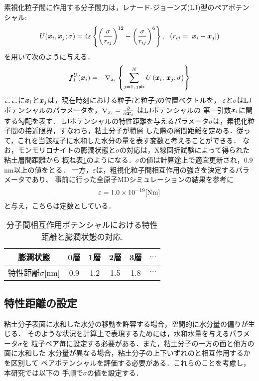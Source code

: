素視化粒子間に作用する分子間力は，レナード-ジョーンズ(LJ)型のペアポテンシャル:
\begin{equation}
	U(\mbox{\boldmath $x$}_i,\mbox{\boldmath $x$}_j; \sigma) 
	= 4 \varepsilon 
	\left\{ 
	\left(\frac{\sigma}{r_{ij}}\right)^{12}
	-
	\left(\frac{\sigma}{r_{ij}}\right)^6
	\right\}, \ \ \left( r_{ij}=\left| \mbox{\boldmath $x$}_i-\mbox{\boldmath $x$}_j\right| \right)
	\label{eqn:LJ}
\end{equation}
を用いて次のように与える．
\begin{equation}
	\mbox{\boldmath $f$}_i^U(\mbox{\boldmath $x$}_i)
	=
	-\nabla_{x_i} 
	\left\{ 
		\sum_{j=1, \, j \neq i}^N U\left(\mbox{\boldmath $x$}_i,\,\mbox{\boldmath $x$}_j; \sigma \right)
	\right\}
	\label{eqn:fiU}
\end{equation}
ここに$\mbox{\boldmath $x$}_i$と$\mbox{\boldmath $x$}_j$は，現在時刻における粒子$i$と粒子$j$の位置ベクトルを，
$\varepsilon$と$\sigma$はLJポテンシャルのパラメータを，$\nabla_{x_i}=\frac{\partial}{\partial \mbox{\boldmath $x$}_i}$
はLJポテンシャルの 第一引数$\mbox{\boldmath $x$}_i$に関する勾配を表す．
LJポテンシャルの特性距離を与えるパラメータ$\sigma$は，素視化粒子間の接近限界，すなわち，粘土分子が積層
した際の層間距離を定める．従って，これを当該粒子に水和した水分の量を表す変数と考えることができる．
なお，モンモリロナイトの膨潤状態と$\sigma$の対応は，X線回折試験によって得られた粘土層間距離から
概ね表\ref{tbl:tbl_sig}のようになる．$\sigma$の値は計算途上で適宜更新され，$0.9$nm以上の値をとる．
一方，$\varepsilon$は，粗視化粒子間相互作用の強さを決定するパラメータであり、
事前に行った全原子MDシミュレーションの結果を参考に
\begin{equation}
	\varepsilon=1.0\times 10^{-19}[{\rm Nm}]
	\label{eqn:LJ_eps}
\end{equation}
と与え，こちらは定数としている．
\begin{table}[h]
	\begin{center}
	\caption{分子間相互作用ポテンシャルにおける特性距離と膨潤状態の対応.}
	\vspace{3mm}
	\begin{tabular}{c||c|c|c|c|c}
		膨潤状態 & 0層 & 1層 & 2層 & 3層 & $\cdots$\\
		\hline
		特性距離$\sigma$[{\rm nm}]& 0.9 & 1.2 & 1.5 & 1.8 & $\cdots$ \\
	\end{tabular}
	\label{tbl:tbl_sig}
	\end{center}
\end{table}
\subsection{特性距離の設定}
粘土分子表面に水和した水分の移動を許容する場合，空間的に水分量の偏りが生じる．
そのような状況を計算上で表現するためには，水和水量を与えるパラメータ$\sigma$を
粒子ペア毎に設定する必要がある．また，粘土分子の一方の面と他方の面に水和した
水分量が異なる場合，粘土分子の上下いずれのと相互作用するかを区別して
ペアポテンシャルを評価する必要がある．これらのことを考慮し，本研究では以下の
手順で$\sigma$の値を設定する．

